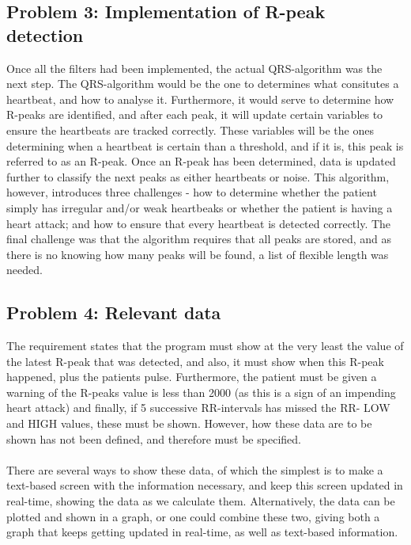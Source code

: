 \documentclass[12pt,a4paper]{article}
\begin{document}
\subsection{Problem 3: Implementation of R-peak detection}
	Once all the filters had been implemented, the actual QRS-algorithm was the next step. The QRS-algorithm would be the one to determines what consitutes a heartbeat, and how to analyse it. Furthermore, it would serve to determine how R-peaks are identified, and after each peak, it will update certain variables to ensure the heartbeats are tracked correctly. These variables will be the ones determining when a heartbeat is certain than a threshold, and if it is, this peak is referred to as an R-peak. Once an R-peak has been determined, data is updated further to classify the next peaks as either heartbeats or noise. This algorithm, however, introduces three challenges - how to determine whether the patient simply has irregular and/or weak heartbeaks or whether the patient is having a heart attack; and how to ensure that every heartbeat is detected correctly. The final challenge was that the algorithm requires that all peaks are stored, and as there is no knowing how many peaks will be found, a list of flexible length was needed.\\

\subsection{Problem 4: Relevant data}
	The requirement states that the program must show at the very least the value of the latest R-peak that was detected, and also, it must show when this R-peak happened, plus the patients pulse. Furthermore, the patient must be given a warning of the R-peaks value is less than 2000 (as this is a sign of an impending heart attack) and finally, if 5 successive RR-intervals has missed the RR- LOW and HIGH values, these must be shown. However, how these data are to be shown has not been defined, and therefore must be specified.\\
	\\
	There are several ways to show these data, of which the simplest is to make a text-based screen with the information necessary, and keep this screen updated in real-time, showing the data as we calculate them. Alternatively, the data can be plotted and shown in a graph, or one could combine these two, giving both a graph that keeps getting updated in real-time, as well as text-based information.\\
\end{document}
